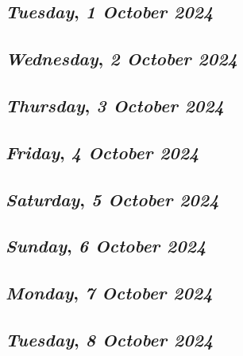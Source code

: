 \begin{center}
\section*{\month}
\end{center}

\def\day{\textit{1 October 2024}}
\def\weekday{\textit{Tuesday}}
\subsection*{\weekday, \day}

\def\day{\textit{2 October 2024}}
\def\weekday{\textit{Wednesday}}
\subsection*{\weekday, \day}

\def\day{\textit{3 October 2024}}
\def\weekday{\textit{Thursday}}
\subsection*{\weekday, \day}

\def\day{\textit{4 October 2024}}
\def\weekday{\textit{Friday}}
\subsection*{\weekday, \day}

\def\day{\textit{5 October 2024}}
\def\weekday{\textit{Saturday}}
\subsection*{\weekday, \day}

\def\day{\textit{6 October 2024}}
\def\weekday{\textit{Sunday}}
\subsection*{\weekday, \day}

\def\day{\textit{7 October 2024}}
\def\weekday{\textit{Monday}}
\subsection*{\weekday, \day}

\def\day{\textit{8 October 2024}}
\def\weekday{\textit{Tuesday}}
\subsection*{\weekday, \day}

